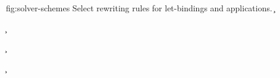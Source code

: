\documentclass[acmsmall,screen,nonacm,review]{acmart}
\begin{document}
\begin{mathparfig}[htpb!]
  {fig:solver-schemes}
  {Select rewriting rules for let-bindings and applications.}
    {\cletr \x \tv \tvs \c {\C\where{\cexistsi {\tvc, \inst} \x {\cunif \tvc \t \cand \cpinst \inst \tv \tvc}}}}

    {\cletr \x \tv \tvs {\c}
      \C{}}

    {\cpinst \inst \tv \tvca \cand \cunif \tvca \tvcb}

    {\cletr \x \tv {\tvs,\tvp} {\ueqs \cand \c} {\C\where\ctrue}}

    {\cletr \x \tv \tvs \c {\C\where{\cunif \tvb \tvc}}}

    {\c}

  \rewrite[S-Compress]
    {\cletr \x \tv {\tvs} {\ca \cand \cunif \tvb {\cunif \tvc \ueq}} {\cb} \\ \tvb \in \reg \tv \tvs }
    {\cletr \x \tv {\tvs, \tvb} {\ca\where{\tvb \is \tvc} \cand \cunif \tvc {\ueq\where{\tvc \is \tvc}}} {\cb{}}}


\end{mathparfig}
\end{document}

